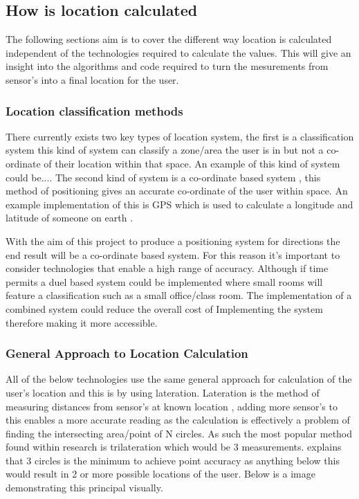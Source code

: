 \subsection{How is location calculated}
The following sections aim is to cover the different way location is calculated independent of the technologies required to calculate the values. This will give an insight into the algorithms and code required to turn the mesurements from sensor's into a final location for the user. 

\subsubsection{Location classification methods}
There currently exists two key types of location system, the first is a classification system \citetemp this kind of system can classify a zone/area the user is in but not a co-ordinate of their location within that space. An example of this kind of system could be....
The second kind of system is a co-ordinate based system \citetemp, this method of positioning gives an accurate co-ordinate of the user within space. An example implementation of this is GPS which is used to calculate a longitude and latitude of someone on earth \citetemp.

With the aim of this project to produce a positioning system for directions the end result will be a co-ordinate based system. For this reason it's important to consider technologies that enable a high range of accuracy. Although if time permits a duel based system could be implemented where small rooms will feature a classification such as a small office/class room. The implementation of a combined system could reduce the overall cost of Implementing the system therefore making it more accessible.

\subsubsection{General Approach to Location Calculation}
All of the below technologies use the same general approach for calculation of the user's location and this is by using lateration. Lateration is the method of measuring distances from sensor's at known location \citetemp, adding more sensor's to this enables a more accurate reading as the calculation is effectively a problem of finding the intersecting area/point of N circles. As such the most popular method found within research is trilateration which would be 3 measurements. \citetemp explains that 3 circles is the minimum to achieve point accuracy as anything below this would result in 2 or more possible locations of the user. Below is a image demonstrating this principal visually.

